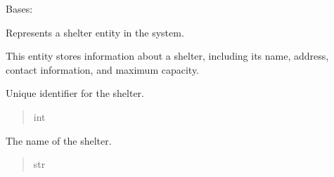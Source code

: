 \documentclass[letterpaper,10pt,english]{sphinxmanual}
\begin{document}
\begin{fulllineitems}
\label{\detokenize{app.mysql:app.mysql.shelter.Shelter}}
\pysigstartsignatures
\pysiglinewithargsret
{}
{}
{}
\pysigstopsignatures
\sphinxAtStartPar
Bases: 

\sphinxAtStartPar
Represents a shelter entity in the system.

\sphinxAtStartPar
This entity stores information about a shelter, including its name,
address, contact information, and maximum capacity.

\begin{fulllineitems}
\label{\detokenize{app.mysql:app.mysql.shelter.Shelter.idShelter}}
\pysigstartsignatures
\pysigline
{}
\pysigstopsignatures
\sphinxAtStartPar
Unique identifier for the shelter.
\begin{quote}\begin{description}
\sphinxAtStartPar
int

\end{description}\end{quote}

\end{fulllineitems}


\begin{fulllineitems}
\label{\detokenize{app.mysql:app.mysql.shelter.Shelter.shelterName}}
\pysigstartsignatures
\pysigline
{}
\pysigstopsignatures
\sphinxAtStartPar
The name of the shelter.
\begin{quote}\begin{description}
\sphinxAtStartPar
str

\end{description}\end{quote}

\end{fulllineitems}



\end{fulllineitems}
\end{document}
